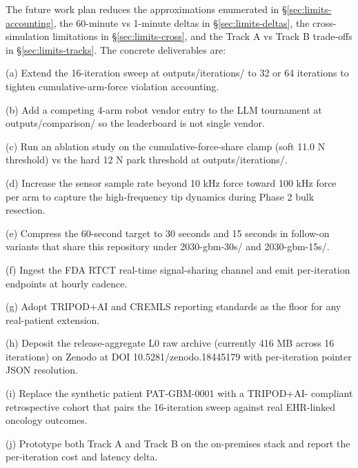 The future work plan reduces the approximations enumerated in
\S\ref{sec:limits-accounting}, the 60-minute vs 1-minute deltas in
\S\ref{sec:limits-deltas}, the cross-simulation limitations in
\S\ref{sec:limits-cross}, and the Track A vs Track B trade-offs in
\S\ref{sec:limits-tracks}. The concrete deliverables are:

(a) Extend the 16-iteration sweep at outputs/iterations/ to 32 or
64 iterations to tighten cumulative-arm-force violation accounting.

(b) Add a competing 4-arm robot vendor entry to the LLM tournament
at outputs/comparison/ so the leaderboard is not single vendor.

(c) Run an ablation study on the cumulative-force-share clamp (soft
11.0 N threshold) vs the hard 12 N park threshold at
outputs/iterations/.

(d) Increase the sensor sample rate beyond 10 kHz force toward 100
kHz force per arm to capture the high-frequency tip dynamics during
Phase 2 bulk resection.

(e) Compress the 60-second target to 30 seconds and 15 seconds in
follow-on variants that share this repository under 2030-gbm-30s/
and 2030-gbm-15s/.

(f) Ingest the FDA RTCT real-time signal-sharing channel
\cite{fda2026realtime} and emit per-iteration endpoints at hourly
cadence.

(g) Adopt TRIPOD+AI and CREMLS reporting standards
\cite{Collins2024TRIPODAI, ElEmam2024CREMLS} as the floor for any
real-patient extension.

(h) Deposit the release-aggregate L0 raw archive (currently 416 MB
across 16 iterations) on Zenodo \cite{zenodo} at DOI
10.5281/zenodo.18445179 with per-iteration pointer JSON resolution.

(i) Replace the synthetic patient PAT-GBM-0001 with a TRIPOD+AI-
compliant retrospective cohort that pairs the 16-iteration sweep
against real EHR-linked oncology outcomes.

(j) Prototype both Track A and Track B on the on-premises stack and
report the per-iteration cost and latency delta.
